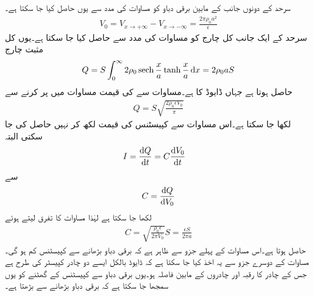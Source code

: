 سرحد کے دونوں جانب کے مابین برقی دباو  کو مساوات  کی مدد سے یوں حاصل کیا جا سکتا ہے۔
\begin{align}\label{مساوات_لاپلاس_ڈایوڈ_اندرونی_دباو}
V_0=V_{x \to +\infty}-V_{x \to -\infty}=\frac{2\pi\rho_0 a^2}{\epsilon}
\end{align}
سرحد کے ایک جانب کل چارج کو مساوات  کی مدد سے حاصل کیا جا سکتا ہے۔یوں کل مثبت چارج
\begin{align}\label{مساوات_لاپلاس_ڈایوڈ_کل_چارج_الف}
Q=S \int_0^{\infty} 2 \rho_0 \sech \frac{x}{a}\tanh \frac{x}{a} \dif x=2\rho_0 a S
\end{align}
حاصل ہوتا ہے جہاں ڈایوڈ کا   ہے۔مساوات  سے  کی قیمت مساوات  میں پر کرنے سے
\begin{align}\label{مساوات_لاپلاس_ڈایوڈ_کل_چارج_ب}
Q=S \sqrt{\frac{2\rho_0 \epsilon V_0}{\pi}}
\end{align} 
لکھا جا سکتا ہے۔اس مساوات سے کپیسٹنس کی قیمت  لکھ کر نہیں حاصل کی جا سکتی البتہ
\begin{align*}
I&=\frac{\dif Q}{\dif t} =C \frac{\dif V_0}{\dif t}
\end{align*}
سے
\begin{align*}
C=\frac{\dif Q}{\dif V_0}
\end{align*}
لکھا جا سکتا ہے  لہٰذا مساوات  کا تفرق لیتے ہوئے
\begin{align*}
C=\sqrt{\frac{\rho_0 \epsilon}{2\pi V_0}} S=\frac{\epsilon S}{2\pi a}
\end{align*}
حاصل ہوتا ہے۔اس مساوات  کے پہلے جزو سے ظاہر ہے کہ برقی دباو بڑھانے سے کپیسٹنس کم ہو گی۔مساوات کے دوسرے جزو سے یہ اخذ کیا جا سکتا ہے کہ ڈایوڈ بالکل ایسے  دو چادر کپیسٹر کی طرح ہے جس کے چادر کا رقبہ  اور چادروں کے مابین فاصلہ   ہو۔یوں برقی دباو سے کپیسٹنس کے گھٹنے کو یوں سمجھا جا سکتا ہے کہ برقی دباو بڑھانے سے   بڑھتا ہے۔ 

